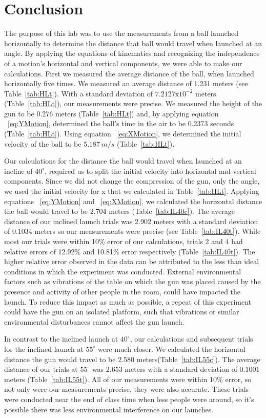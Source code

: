 
\section{Conclusion}

\vspace{-0.5cm}
\singlespacing

The purpose of this lab was to use the measurements from a ball launched horizontally to determine the distance that ball would travel when launched at an angle. By applying the equations of kinematics and recognizing the independence of a motion's horizontal and vertical components, we were able to make our calculations. First we measured the average distance of the ball, when launched horizontally five times. We measured an average distance of 1.231 meters (see Table~\ref{tab:HLt}). With a standard deviation of $7.2127\text{x}10^{-2}$ meters (Table~\ref{tab:HLt}), our measurements were precise. We measured the height of the gun to be 0.276 meters (Table~\ref{tab:HLt}) and, by applying equation ~\ref{eq:YMotion}, determined the ball's time in the air to be 0.2373 seconds (Table~\ref{tab:HLt}). Using equation ~\ref{eq:XMotion}, we determined the initial velocity of the ball to be $5.187\,m/s$ (Table~\ref{tab:HLt}).\par
Our calculations for the distance the ball would travel when launched at an incline of $40^\circ$, required us to split the initial velocity into horizontal and vertical components. Since we did not change the compression of the gun, only the angle, we used the initial velocity for x that we calculated in Table~\ref{tab:HLt}. Applying equations ~\ref{eq:YMotion} and ~\ref{eq:XMotion}, we calculated the horizontal distance the ball would travel to be 2.704 meters (Table~\ref{tab:IL40c}). The average distance of our inclined launch trials was  2.902 meters with a standard deviation of 0.1034 meters so our measurements were precise (see Table~\ref{tab:IL40t}). While most our trials were within 10\% error of our calculations, trials 2 and 4 had relative errors of 12.92\% and 10.81\% error respectively (Table~\ref{tab:IL40t}). The higher relative error observed in the data can be attributed to the less than ideal conditions in which the experiment was conducted. External environmental factors such as vibrations of the table on which the gun was placed caused by the presence and activity of other people in the room, could have impacted the launch. To reduce this impact as much as possible, a repeat of this experiment could have the gun on an isolated platform, such that vibrations or similar environmental disturbances cannot affect the gun launch. \par
In contrast to the inclined launch at $40^\circ$, our calculations and subsequent trials for the inclined launch at $55^\circ$ were much closer. We calculated the horizontal distance the gun would travel to be 2.580 meters(Table~\ref{tab:IL55c}). The average distance of our trials at $55^\circ$ was 2.653 meters with a standard deviation of 0.1001 meters (Table~\ref{tab:IL55t}). All of our measurements were within 10\% error, so not only were our measurements precise, they were also accurate. These trials were conducted near the end of class time when less people were around, so it's possible there was less environmental interference on our launches. 
